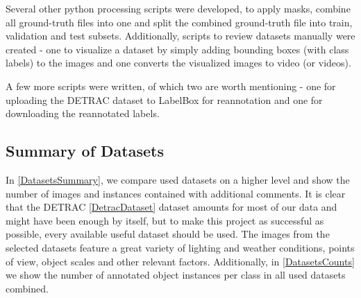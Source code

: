 Several other python processing scripts were developed, to apply masks, combine
all ground-truth files into one and split the combined ground-truth file into
train, validation and test subsets. Additionally, scripts to review datasets
manually were created - one to visualize a dataset by simply adding bounding
boxes (with class labels) to the images and one converts the visualized images
to video (or videos).

A few more scripts were written, of which two are worth mentioning - one for
uploading the DETRAC dataset to LabelBox for reannotation and one for
downloading the reannotated labels.


\subsection{Summary of Datasets}

In \autoref{DatasetsSummary}, we compare used datasets on a higher level and
show the number of images and instances contained with additional comments. It
is clear that the DETRAC \autoref{DetracDataset} dataset amounts for most of our
data and might have been enough by itself, but to make this project as
successful as possible, every available useful dataset should be used. The
images from the selected datasets feature a great variety of lighting and
weather conditions, points of view, object scales and other relevant factors.
Additionally, in \autoref{DatasetsCounts} we show the number of annotated object
instances per class in all used datasets combined. 


